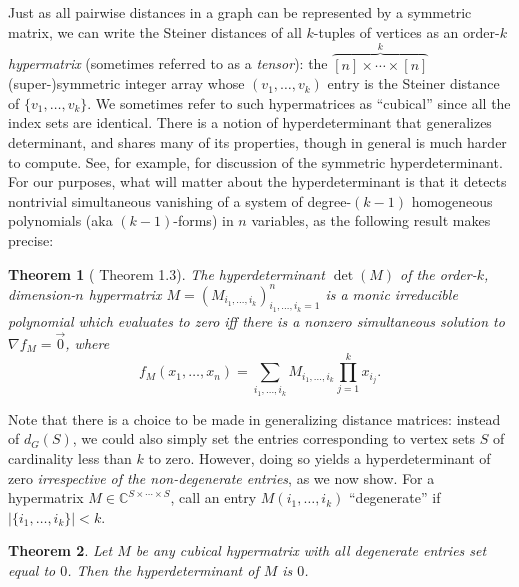 \documentclass{article}
\newtheorem{theorem}{Theorem}[section]
\begin{document}
Just as all pairwise distances in a graph can be represented by a symmetric matrix, we can write the Steiner distances of all $k$-tuples of vertices as an order-$k$ {\em hypermatrix} (sometimes referred to as a {\em tensor}): the $\overbrace{[n] \times \cdots \times [n]}^k$ (super-)symmetric integer array whose $(v_1,\ldots,v_k)$ entry is the Steiner distance of $\{v_1,\ldots,v_k\}$.  We sometimes refer to such hypermatrices as ``cubical'' since all the index sets are identical. There is a notion of hyperdeterminant that generalizes determinant, and shares many of its properties, though in general is much harder to compute.  See, for example, \cite{Qi05} for discussion of the symmetric hyperdeterminant.  For our purposes, what will matter about the hyperdeterminant is that it detects nontrivial simultaneous vanishing of a system of degree-$(k-1)$ homogeneous polynomials (aka $(k-1)$-forms) in $n$ variables, as the following result makes precise:

\begin{theorem}[\cite{GelKapZel08} Theorem 1.3] \label{thm:hyperdeterminant} The hyperdeterminant $\det(M)$ of the order-$k$, dimension-$n$ hypermatrix $M = (M_{i_1,\ldots,i_k})_{i_1,\ldots,i_k=1}^n$ is a monic irreducible polynomial which evaluates to zero iff there is a nonzero simultaneous solution to $\nabla f_M = \vec{0}$, where
$$
f_M(x_1,\ldots,x_n) = \sum_{i_1,\ldots,i_k} M_{i_1,\ldots,i_k} \prod_{j=1}^k x_{i_j}.
$$
\end{theorem}


Note that there is a choice to be made in generalizing distance matrices: instead of $d_G(S)$, we could also simply set the entries corresponding to vertex sets $S$ of cardinality less than $k$ to zero.  However, doing so yields a hyperdeterminant of zero {\em irrespective of the non-degenerate entries}, as we now show. For a hypermatrix $M \in \mathbb{C}^{S \times \cdots \times S}$, call an entry $M(i_1,\ldots,i_k)$ ``degenerate'' if $|\{i_1,\ldots,i_k\}| < k$.

\begin{theorem}
Let $M$ be any cubical hypermatrix with all degenerate entries set equal to $0$. Then the hyperdeterminant of $M$ is $0$. 
\end{theorem}
\end{document}
